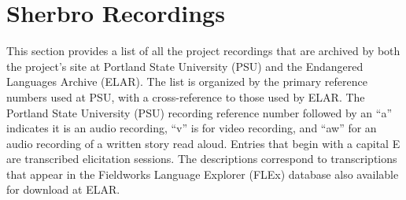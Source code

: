 \chapter{Sherbro Recordings}
\label{app:g}

This section provides a list of all the project recordings that are archived by both the project's site at Portland State University (PSU) and the Endangered Languages Archive (ELAR). The list is organized by the primary reference numbers used at PSU, with a cross-reference to those used by ELAR. The Portland State University (PSU) recording reference number followed by an “a” indicates it is an audio recording, “v” is for video recording, and “aw” for an audio recording of a written story read aloud. Entries that begin with a capital E are transcribed elicitation sessions. The descriptions correspond to transcriptions that appear in the Fieldworks Language Explorer (FLEx) database also available for download at ELAR. 


